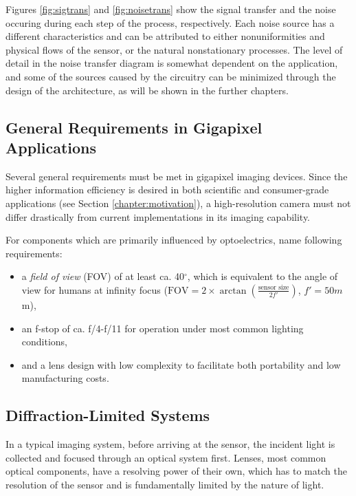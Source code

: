 Figures \ref{fig:sigtrans} and \ref{fig:noisetrans} show the signal transfer and the noise occuring during each step of the process, respectively. Each noise source has a different characteristics and can be attributed to either nonuniformities and physical flows of the sensor, or the natural nonstationary processes. The level of detail in the noise transfer diagram is somewhat dependent on the application, and some of the sources caused by the circuitry can be minimized through the design of the architecture, as will be shown in the further chapters. 

\subsection{General Requirements in Gigapixel Applications}

Several general requirements must be met in gigapixel imaging devices. Since the higher information efficiency is desired in both scientific and consumer-grade applications (see Section \ref{chapter:motivation}), a high-resolution camera must not differ drastically from current implementations in its imaging capability.

For components which are primarily influenced by optoelectrics, \cite{GigaOptik} name following requirements:

\begin{itemize}
    \item a \textit{field of view} (FOV) of at least ca. 40$^\circ$, which is equivalent to the angle of view for humans at infinity focus ($\mathrm{FOV} = 2 \times \arctan\left(\frac{\text{sensor size}}{2{f}'}\right)$, ${f}' = 50m$m),
    \item an f-stop of ca. f/4-f/11 for operation under most common lighting conditions,
    \item and a lens design with low complexity to facilitate both portability and low manufacturing costs.
\end{itemize}

\subsection{Diffraction-Limited Systems}%

\label{chapter:diff}

In a typical imaging system, before arriving at the sensor, the incident light is collected and focused through an optical system first. Lenses, most common optical components, have a resolving power of their own, which has to match the resolution of the sensor and is fundamentally limited by the nature of light. 

